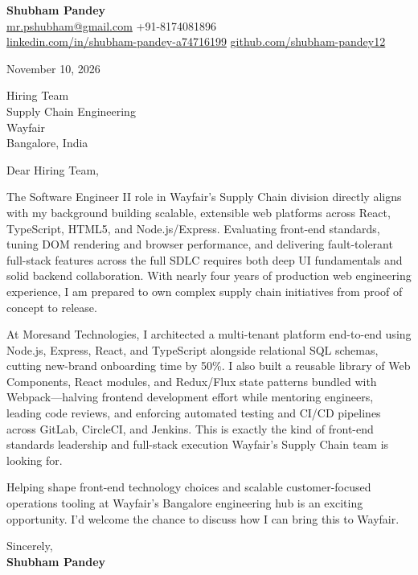 \documentclass[a4paper,11pt]{article}
\begin{document}
\textbf{\Large Shubham Pandey}\\
\href{mailto:mr.pshubham@gmail.com}{mr.pshubham@gmail.com} \quad +91-8174081896\\
\href{https://www.linkedin.com/in/shubham-pandey-a74716199/}{linkedin.com/in/shubham-pandey-a74716199} \quad
\href{https://github.com/shubham-pandey12}{github.com/shubham-pandey12}

\vspace{1em}
November 10, 2026

\vspace{1em}
Hiring Team\\
Supply Chain Engineering\\
Wayfair\\
Bangalore, India

\vspace{1em}
Dear Hiring Team,

The Software Engineer II role in Wayfair's Supply Chain division directly aligns with my background building scalable, extensible web platforms across React, TypeScript, HTML5, and Node.js/Express. Evaluating front-end standards, tuning DOM rendering and browser performance, and delivering fault-tolerant full-stack features across the full SDLC requires both deep UI fundamentals and solid backend collaboration. With nearly four years of production web engineering experience, I am prepared to own complex supply chain initiatives from proof of concept to release.

At Moresand Technologies, I architected a multi-tenant platform end-to-end using Node.js, Express, React, and TypeScript alongside relational SQL schemas, cutting new-brand onboarding time by 50\%. I also built a reusable library of Web Components, React modules, and Redux/Flux state patterns bundled with Webpack---halving frontend development effort while mentoring engineers, leading code reviews, and enforcing automated testing and CI/CD pipelines across GitLab, CircleCI, and Jenkins. This is exactly the kind of front-end standards leadership and full-stack execution Wayfair's Supply Chain team is looking for.

Helping shape front-end technology choices and scalable customer-focused operations tooling at Wayfair's Bangalore engineering hub is an exciting opportunity. I'd welcome the chance to discuss how I can bring this to Wayfair.

\vspace{1em}
Sincerely,\\[0.5em]
\textbf{Shubham Pandey}
\end{document}
